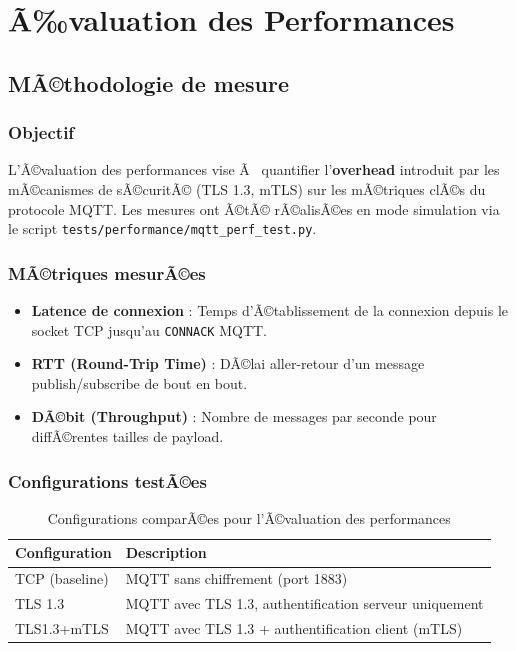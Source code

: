 \chapter{Ã‰valuation des Performances}

\section{MÃ©thodologie de mesure}

\subsection{Objectif}

L'Ã©valuation des performances vise Ã  quantifier l'\textbf{overhead} introduit par les mÃ©canismes de sÃ©curitÃ© (TLS 1.3, mTLS) sur les mÃ©triques clÃ©s du protocole MQTT. Les mesures ont Ã©tÃ© rÃ©alisÃ©es en mode simulation via le script \texttt{tests/performance/mqtt\_perf\_test.py}.

\subsection{MÃ©triques mesurÃ©es}

\begin{itemize}
  \item \textbf{Latence de connexion} : Temps d'Ã©tablissement de la connexion depuis le socket TCP jusqu'au \texttt{CONNACK} MQTT.
  \item \textbf{RTT (Round-Trip Time)} : DÃ©lai aller-retour d'un message publish/subscribe de bout en bout.
  \item \textbf{DÃ©bit (Throughput)} : Nombre de messages par seconde pour diffÃ©rentes tailles de payload.
\end{itemize}

\subsection{Configurations testÃ©es}

\begin{table}[H]
\centering
\caption{Configurations comparÃ©es pour l'Ã©valuation des performances}
\label{tab:perf_configs}
\begin{tabular}{ll}
\toprule
\textbf{Configuration} & \textbf{Description} \\
\midrule
TCP (baseline) & MQTT sans chiffrement (port 1883) \\
TLS 1.3 & MQTT avec TLS 1.3, authentification serveur uniquement \\
TLS1.3+mTLS & MQTT avec TLS 1.3 + authentification client (mTLS) \\
\bottomrule
\end{tabular}
\end{table}


